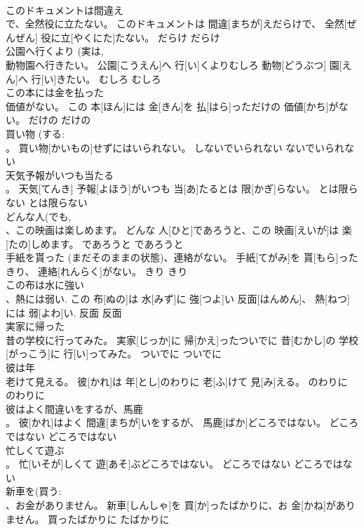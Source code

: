 \documentclass[8pt]{extreport}
\begin{document}
\begin{CJK}{UTF8}{min}
\\	このドキュメントは間違え 
\\	で、全然役に立たない。	このドキュメントは 間違[まちが]えだらけで、 全然[ぜんぜん] 役に立[やくにた]たない。	だらけ	だらけ	
\\	公園へ行くより (実は, 
\\	動物園へ行きたい。	公園[こうえん]へ 行[い]くよりむしろ 動物[どうぶつ] 園[えん]へ 行[い]きたい。	むしろ	むしろ	
\\	この本には金を払った 
\\	価値がない。	この 本[ほん]には 金[きん]を 払[はら]っただけの 価値[かち]がない。	だけの	だけの	
\\	買い物 (する: 
\\	。	買い物[かいもの]せずにはいられない。	しないでいられない	ないでいられない	
\\	天気予報がいつも当たる 
\\	。	天気[てんき] 予報[よほう]がいつも 当[あ]たるとは 限[かぎ]らない。	とは限らない	とは限らない	
\\	どんな人(でも, 
\\	、この映画は楽しめます。	どんな 人[ひと]であろうと、この 映画[えいが]は 楽[たの]しめます。	であろうと	であろうと	
\\	手紙を貰った (まだそのままの状態)、連絡がない。	手紙[てがみ]を 貰[もら]ったきり、 連絡[れんらく]がない。	きり	きり	
\\	この布は水に強い 
\\	、熱には弱い.	この 布[ぬの]は 水[みず]に 強[つよ]い 反面[はんめん]、 熱[ねつ]には 弱[よわ]い.	反面	反面	
\\	実家に帰った 
\\	昔の学校に行ってみた。	実家[じっか]に 帰[かえ]ったついでに 昔[むかし]の 学校[がっこう]に 行[い]ってみた。	ついでに	ついでに	
\\	彼は年 
\\	老けて見える。	彼[かれ]は 年[とし]のわりに 老[ふ]けて 見[み]える。	のわりに	のわりに	
\\	彼はよく間違いをするが、馬鹿 
\\	。	彼[かれ]はよく 間違[まちが]いをするが、 馬鹿[ばか]どころではない。	どころではない	どころではない	
\\	忙しくて遊ぶ 
\\	。	忙[いそが]しくて 遊[あそ]ぶどころではない。	どころではない	どころではない	
\\	新車を(買う: 
\\	、お金がありません。	新車[しんしゃ]を 買[か]ったばかりに、お 金[かね]がありません。	買ったばかりに	たばかりに	

\end{CJK}
\end{document}
